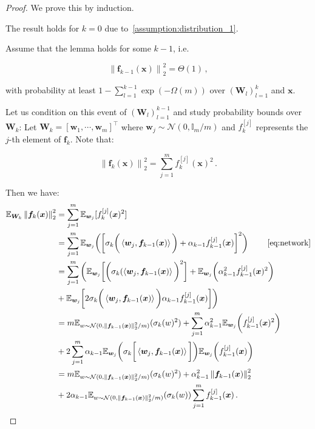 \documentclass[nohyperref]{article}
\theoremstyle{plain}
\theoremstyle{definition}
\theoremstyle{remark}
\begin{document}
\begin{proof}
We prove this by induction.

The result holds for $k = 0$ due to~\cref{assumption:distribution_1}.

Assume that the lemma holds for some $k-1$, i.e. 

\begin{equation*}
\left \| \bm{f}_{k-1}(\bm{x}) \right \|_2^2 = \Theta (1)\,,
\end{equation*}

with probability at least $1-\sum_{l=1}^{k-1}\exp(-\Omega (m))$ over $(\bm{W}_l)_{l=1}^k$ and $\bm{x}$. 

Let us condition on this event of $(\bm{W}_l)_{l=1}^{k-1}$ and study probability bounds over $\bm{W}_k$: Let $\bm{W}_k = \left [\bm{w}_1,\cdots ,\bm{w}_{m}   \right ] ^{\top}$ where $\bm{w}_j\sim \mathcal{N}(0,\mathbb{I}_{m}/m )$ and $f_{k}^{[j]}$ represents the $j$-th element of $\bm{f}_{k}$. Note that:

\begin{equation}
\left \| \bm{f}_k(\bm{x}) \right \|_2^2 = \sum_{j = 1}^{m} f_{k}^{[j]}(\bm{x})^2\,.
\label{eq:proof_lemma_C.1_in_ICML_1}
\end{equation}

Then we have:
\begin{equation}
\begin{split}
    \mathbb{E}_{\bm{W}_k} \left \| \bm{f}_k(\bm{x}) \right \|_2^2 & = \sum_{j = 1}^{m} \mathbb{E}_{\bm{w}_j} [f_{k}^{[j]}(\bm{x})^2]\\
    & = \sum_{j = 1}^{m}\mathbb{E}_{\bm{w}_j}\bigg(\bigg[\sigma_k\bigg(\left \langle \bm{w}_j, \bm{f}_{k-1}(\bm{x}) \right \rangle \bigg)+\alpha_{k-1}f_{k-1}^{[j]}(\bm{x})\bigg]^2\bigg) \quad\quad ~\cref{eq:network}\\
    & = \sum_{j = 1}^{m}\bigg(\mathbb{E}_{\bm{w}_j}\bigg[\bigg(\sigma_k(\left \langle \bm{w}_j, \bm{f}_{k-1}(\bm{x}) \right \rangle \bigg)^2\bigg]+\mathbb{E}_{\bm{w}_j}\bigg(\alpha_{k-1}^2 f_{k-1}^{[j]}(\bm{x})^2\bigg)\\
    & +\mathbb{E}_{\bm{w}_j}\bigg[2\sigma_k\bigg(\left \langle \bm{w}_j, \bm{f}_{k-1}(\bm{x}) \right \rangle\bigg) \alpha_{k-1} f_{k-1}^{[j]}(\bm{x})\bigg]\bigg)\\
    & =m\mathbb{E}_{w\sim \mathcal N(0,\left \| \bm{f}_{k-1}(\bm{x}) \right \|_2^2/m )}(\sigma_k(w)^2)+\sum_{j = 1}^{m}\alpha_{k-1}^2\mathbb{E}_{\bm{w}_j}\bigg( f_{k-1}^{[j]}(\bm{x})^2\bigg)\\
    & +2\sum_{j = 1}^{m}\alpha_{k-1}\mathbb{E}_{\bm{w}_j}\bigg(\sigma_k\bigg[\left \langle \bm{w}_j, \bm{f}_{k-1}(\bm{x}) \right \rangle\bigg]\bigg)\mathbb{E}_{\bm{w}_j}\bigg(f_{k-1}^{[j]}(\bm{x})\bigg)\\
    & = m\mathbb{E}_{w\sim \mathcal N(0,\left \| \bm{f}_{k-1}(\bm{x}) \right \|_2^2/m )}(\sigma_k(w)^2)+\alpha_{k-1}^2\left \| \bm{f}_{k-1}(\bm{x}) \right \|_2^2\\
    & +2\alpha_{k-1}\mathbb{E}_{w\sim \mathcal N(0,\left \| \bm{f}_{k-1}(\bm{x}) \right \|_2^2/m )}(\sigma_k(w))\sum_{j = 1}^{m}f_{k-1}^{[j]}(\bm{x})\,.
\end{split}
\label{eq:proof_lemma_C.1_in_ICML_2}
\end{equation}


\end{proof}
\end{document}
